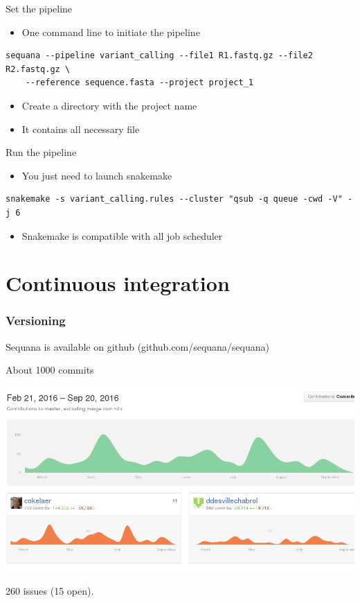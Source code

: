 \documentclass{beamer}
\begin{document}
\begin{frame}[fragile]{Set the pipeline}
    \begin{itemize}
        \item One command line to initiate the pipeline
    \end{itemize}
    \begin{lstlisting}
sequana --pipeline variant_calling --file1 R1.fastq.gz --file2 R2.fastq.gz \
    --reference sequence.fasta --project project_1
    \end{lstlisting}
    \begin{itemize}
        \item Create a directory with the project name
        \item It contains all necessary file
    \end{itemize}
\end{frame}

\begin{frame}[fragile]{Run the pipeline}
    \begin{itemize}
        \item You just need to launch snakemake
    \end{itemize}
    \begin{lstlisting}
snakemake -s variant_calling.rules --cluster "qsub -q queue -cwd -V" -j 6
    \end{lstlisting}
    \begin{itemize}
        \item Snakemake is compatible with all job scheduler
    \end{itemize}
\end{frame}

\section{Continuous integration}

\begin{frame}
 \frametitle{Versioning}
Sequana is available on github (github.com/sequana/sequana)

About 1000 commits \\
\begin{center}
\includegraphics[scale=0.2]{images/commits}
\end{center}
260 issues (15 open).

\end{frame}
\end{document}
